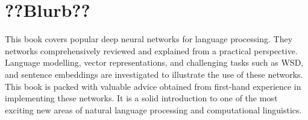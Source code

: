 \documentclass[12pt,parskip]{komatufte}
\begin{document}
\section{??Blurb??}
This book covers popular deep neural networks for language processing.
They networks comprehensively reviewed and explained from a practical perspective.
Language modelling, vector representations, and challenging tasks such as WSD, and sentence embeddings are investigated to illustrate the use of these networks.
This book is packed with valuable advice obtained from first-hand experience in implementing these networks.
It is a solid introduction to one of the most exciting new areas of natural language processing and computational linguistics.
\end{document}
